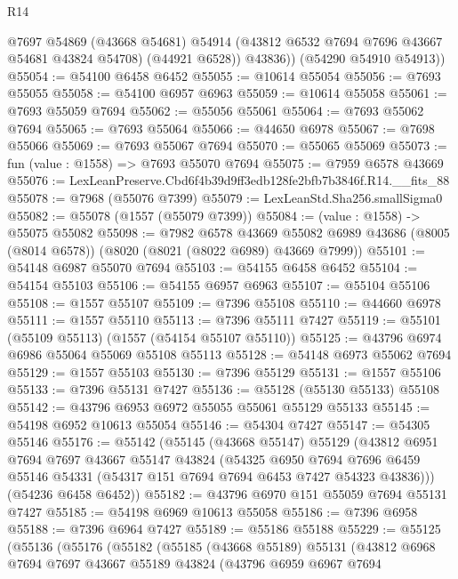 \begin{lexlean}{R14}
\begin{coremodule}
            @7697
            @54869
            (@43668 @54681)
            @54914
            (@43812 @6532 @7694 @7696 @43667 @54681 @43824 @54708)
            (@44921 @6528))
          @43836))
      (@54290 @54910 @54913))
@55054 := @54100 @6458 @6452
@55055 := @10614 @55054
@55056 := @7693 @55055
@55058 := @54100 @6957 @6963
@55059 := @10614 @55058
@55061 := @7693 @55059 @7694
@55062 := @55056 @55061
@55064 := @7693 @55062 @7694
@55065 := @7693 @55064
@55066 := @44650 @6978
@55067 := @7698 @55066
@55069 := @7693 @55067 @7694
@55070 := @55065 @55069
@55073 := fun (value : @1558) => @7693 @55070 @7694
@55075 := @7959 @6578 @43669
@55076 := LexLeanPreserve.Cbd6f4b39d9ff3edb128fe2bfb7b3846f.R14.__fits_88
@55078 := @7968 (@55076 @7399)
@55079 := LexLeanStd.Sha256.smallSigma0
@55082 := @55078 (@1557 (@55079 @7399))
@55084 := (value : @1558) -> @55075 @55082
@55098 := @7982
    @6578
    @43669
    @55082
    @6989
    @43686
    (@8005 (@8014 @6578))
    (@8020 (@8021 (@8022 @6989) @43669 @7999))
@55101 := @54148 @6987 @55070 @7694
@55103 := @54155 @6458 @6452
@55104 := @54154 @55103
@55106 := @54155 @6957 @6963
@55107 := @55104 @55106
@55108 := @1557 @55107
@55109 := @7396 @55108
@55110 := @44660 @6978
@55111 := @1557 @55110
@55113 := @7396 @55111 @7427
@55119 := @55101 (@55109 @55113) (@1557 (@54154 @55107 @55110))
@55125 := @43796 @6974 @6986 @55064 @55069 @55108 @55113
@55128 := @54148 @6973 @55062 @7694
@55129 := @1557 @55103
@55130 := @7396 @55129
@55131 := @1557 @55106
@55133 := @7396 @55131 @7427
@55136 := @55128 (@55130 @55133) @55108
@55142 := @43796 @6953 @6972 @55055 @55061 @55129 @55133
@55145 := @54198 @6952 @10613 @55054
@55146 := @54304 @7427
@55147 := @54305 @55146
@55176 := @55142
    (@55145
      (@43668 @55147)
      @55129
      (@43812
        @6951
        @7694
        @7697
        @43667
        @55147
        @43824
        (@54325
          @6950
          @7694
          @7696
          @6459
          @55146
          @54331
          (@54317 @151 @7694 @7694 @6453 @7427 @54323 @43836)))
      (@54236 @6458 @6452))
@55182 := @43796 @6970 @151 @55059 @7694 @55131 @7427
@55185 := @54198 @6969 @10613 @55058
@55186 := @7396 @6958
@55188 := @7396 @6964 @7427
@55189 := @55186 @55188
@55229 := @55125
    (@55136
      (@55176
        (@55182
          (@55185
            (@43668 @55189)
            @55131
            (@43812
              @6968
              @7694
              @7697
              @43667
              @55189
              @43824
              (@43796
                @6959
                @6967
                @7694

\end{coremodule}
\end{lexlean}
